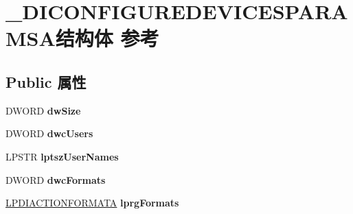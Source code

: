 \hypertarget{struct___d_i_c_o_n_f_i_g_u_r_e_d_e_v_i_c_e_s_p_a_r_a_m_s_a}{}\section{\+\_\+\+D\+I\+C\+O\+N\+F\+I\+G\+U\+R\+E\+D\+E\+V\+I\+C\+E\+S\+P\+A\+R\+A\+M\+S\+A结构体 参考}
\label{struct___d_i_c_o_n_f_i_g_u_r_e_d_e_v_i_c_e_s_p_a_r_a_m_s_a}
\subsection*{Public 属性}
\begin{DoxyCompactItemize}
\item 
\mbox{\label{struct___d_i_c_o_n_f_i_g_u_r_e_d_e_v_i_c_e_s_p_a_r_a_m_s_a_a1638f421326f307ef39e9748e16d6539}} 
D\+W\+O\+RD {\bfseries dw\+Size}
\item 
\mbox{\label{struct___d_i_c_o_n_f_i_g_u_r_e_d_e_v_i_c_e_s_p_a_r_a_m_s_a_adbbc117bf9610a77409946dc715f6071}} 
D\+W\+O\+RD {\bfseries dwc\+Users}
\item 
\mbox{\label{struct___d_i_c_o_n_f_i_g_u_r_e_d_e_v_i_c_e_s_p_a_r_a_m_s_a_a49673856815f26a84fe8f22b395f729a}} 
L\+P\+S\+TR {\bfseries lptsz\+User\+Names}
\item 
\mbox{\label{struct___d_i_c_o_n_f_i_g_u_r_e_d_e_v_i_c_e_s_p_a_r_a_m_s_a_afed28921d8be8e9ec5ca2bf9ca4e59b8}} 
D\+W\+O\+RD {\bfseries dwc\+Formats}
\item 
\mbox{\label{struct___d_i_c_o_n_f_i_g_u_r_e_d_e_v_i_c_e_s_p_a_r_a_m_s_a_a36069e06c28ad2d039a2a8fe6c986946}} 
\hyperlink{struct___d_i_a_c_t_i_o_n_f_o_r_m_a_t_a}{L\+P\+D\+I\+A\+C\+T\+I\+O\+N\+F\+O\+R\+M\+A\+TA} {\bfseries lprg\+Formats}
\item 
\mbox{\label{struct___d_i_c_o_n_f_i_g_u_r_e_d_e_v_i_c_e_s_p_a_r_a_m_s_a_a11b8f2d820ffa8fb9a0c9e566f7759bc}} 

\end{DoxyCompactItemize}
